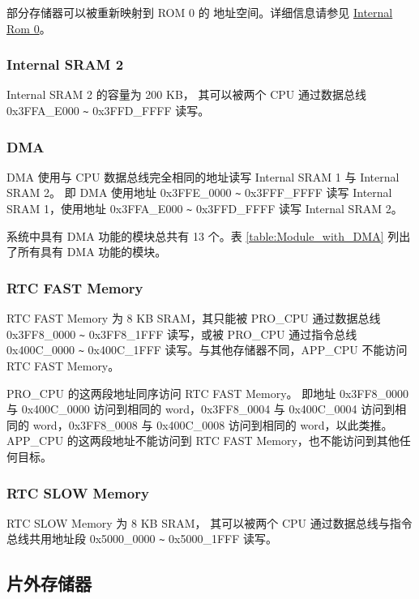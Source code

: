 \documentclass[main\_\_CN.tex]{subfiles}
\begin{document}
部分存储器可以被重新映射到 ROM 0 的 地址空间。详细信息请参见 \hyperref[para:RemapInternalROM0]{Internal Rom 0}。


\subsubsection{Internal SRAM 2}

Internal SRAM 2 的容量为 200 KB，
其可以被两个 CPU 通过数据总线 0x3FFA\_E000 \verb+~+ 0x3FFD\_FFFF 读写。


\subsubsection{DMA}
\label{paragraph: DMA}
\hypertarget{DMA}{}
DMA 使用与 CPU 数据总线完全相同的地址读写 Internal SRAM 1 与 Internal SRAM 2。
即 DMA 使用地址 0x3FFE\_0000 \verb+~+ 0x3FFF\_FFFF 读写 Internal SRAM 1，使用地址 0x3FFA\_E000 \verb+~+ 0x3FFD\_FFFF 读写 Internal SRAM 2。

系统中具有 DMA 功能的模块总共有 13 个。表 \ref{table:Module_with_DMA} 列出了所有具有 DMA 功能的模块。




\subsubsection{RTC FAST Memory}
\hypertarget{PRO_CPU_Only}{}
RTC FAST Memory 为 8 KB SRAM，其只能被 PRO\_CPU 通过数据总线 0x3FF8\_0000 \verb+~+ 0x3FF8\_1FFF 读写，或被 PRO\_CPU 通过指令总线 0x400C\_0000 \verb+~+ 0x400C\_1FFF 读写。与其他存储器不同，APP\_CPU 不能访问 RTC FAST Memory。

PRO\_CPU 的这两段地址同序访问 RTC FAST Memory。
即地址 0x3FF8\_0000 与 0x400C\_0000  访问到相同的 word，0x3FF8\_0004 与 0x400C\_0004 访问到相同的 word，0x3FF8\_0008 与 0x400C\_0008 访问到相同的 word，以此类推。
APP\_CPU 的这两段地址不能访问到 RTC FAST Memory，也不能访问到其他任何目标。


\subsubsection{RTC SLOW Memory}

RTC SLOW Memory 为 8 KB SRAM，
其可以被两个 CPU 通过数据总线与指令总线共用地址段 0x5000\_0000 \verb+~+ 0x5000\_1FFF 读写。


\subsection{片外存储器}
\end{document}
